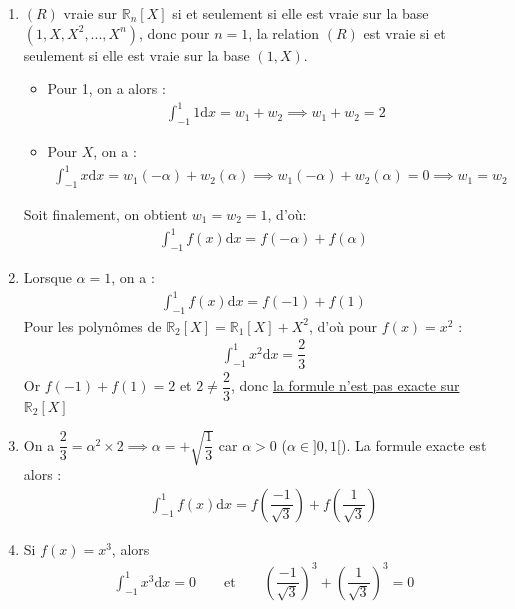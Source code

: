 \documentclass[a4paper]{article}
\begin{document}
\begin{enumerate}
\item $(R)$ vraie sur $\mathbb{R}_n[X]$ si et seulement si elle est vraie sur la base $(1,X,X^2, ..., X^n)$, donc pour $n=1$, la relation $(R)$ est vraie si et seulement si elle est vraie sur la base $(1,X)$. 
\begin{itemize}
\item Pour 1, on a alors : 
\begin{align*}
\int^1_{-1}1 \text{d}x = w_1 + w_2 \implies w_1 + w_2 = 2
\end{align*}
\item Pour $X$, on a : 
\begin{align*}
\int^1_{-1} x \text{d}x = w_1(-\alpha) + w_2(\alpha) \implies w_1(-\alpha) + w_2(\alpha) = 0 \implies w_1 = w_2
\end{align*}
\end{itemize}

Soit finalement, on obtient $w_1 = w_2 = 1$, d'où: 
\begin{align*}
  \int^1_{-1} f(x) \text{d}x = f(-\alpha) + f(\alpha)
\end{align*}

\item Lorsque $\alpha = 1$, on a : 
\begin{align*}
\int^1_{-1} f(x) \text{d}x = f(-1) + f(1)
\end{align*}
Pour les polynômes de $\mathbb{R}_2[X] = \mathbb{R}_1[X] + X^2$, d'où pour $f(x)=x^2$ : 
\begin{align*}
\int^1_{-1} x^2 \text{d}x = \dfrac{2}{3}
\end{align*}
Or $f(-1) + f(1) = 2$ et $2 \neq  \dfrac{2}{3}$, donc \underline{la formule n'est pas exacte sur $\mathbb{R}_2[X]$}


\item On a $\dfrac{2}{3} = \alpha^2 \times 2 \implies \alpha = + \sqrt{\dfrac{1}{3}}$ car $\alpha > 0$ ($\alpha \in ]0,1[$). La formule exacte est alors : 
\begin{align*}
\int^1_{-1} f(x) \text{d}x = f\left(\dfrac{-1}{\sqrt{3}} \right) + f\left(\dfrac{1}{\sqrt{3}}\right)
\end{align*}

\item Si $f(x)=x^3$, alors 
\begin{align*}
\int^1_{-1} x^3 \text{d}x = 0 \qquad \text{et} \qquad \left( \dfrac{-1}{\sqrt{3}}\right)^3 + \left( \dfrac{1}{\sqrt{3}}\right)^3 = 0
\end{align*}


\end{enumerate}
\end{document}
